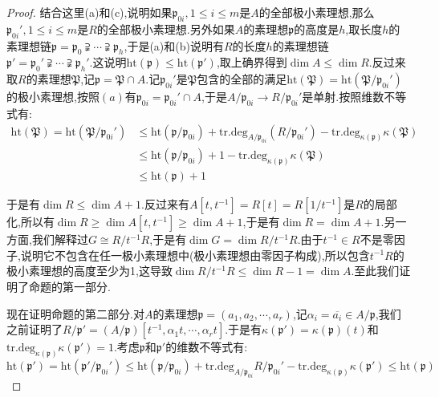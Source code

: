 \begin{enumerate}
\begin{proof}
        结合这里(a)和(c),说明如果$\mathfrak{p}_{0i},1\le i\le m$是$A$的全部极小素理想,那么$\mathfrak{p}_{0i}',1\le i\le m$是$R$的全部极小素理想.另外如果$A$的素理想$\mathfrak{p}$的高度是$h$,取长度$h$的素理想链$\mathfrak{p}=\mathfrak{p}_0\supsetneqq\cdots\supsetneqq\mathfrak{p}_h$,于是(a)和(b)说明有$R$的长度$h$的素理想链$\mathfrak{p}'=\mathfrak{p}_0'\supsetneqq\cdots\supsetneqq\mathfrak{p}_h'$.这说明$\mathrm{ht}(\mathfrak{p})\le\mathrm{ht}(\mathfrak{p}')$,取上确界得到$\dim A\le\dim R$.反过来取$R$的素理想$\mathfrak{P}$,记$\mathfrak{p}=\mathfrak{P}\cap A$.记$\mathfrak{p}_{0i}'$是$\mathfrak{P}$包含的全部的满足$\mathrm{ht}(\mathfrak{P})=\mathrm{ht}(\mathfrak{P}/\mathfrak{p}_{0i}')$的极小素理想,按照$(a)$有$\mathfrak{p}_{0i}=\mathfrak{p}_{0i}'\cap A$,于是$A/\mathfrak{p}_{0i}\to R/\mathfrak{p}_{0i}'$是单射.按照维数不等式有:
        \begin{align*}
        	\mathrm{ht}(\mathfrak{P})=\mathrm{ht}(\mathfrak{P}/\mathfrak{p}_{0i}')&\le\mathrm{ht}(\mathfrak{p}/\mathfrak{p}_{0i})+\mathrm{tr.deg}_{A/\mathfrak{p}_{0i}}(R/\mathfrak{p}_{0i}')-\mathrm{tr.deg}_{\kappa(\mathfrak{p})}\kappa(\mathfrak{P})\\&\le\mathrm{ht}(\mathfrak{p}/\mathfrak{p}_{0i})+1-\mathrm{tr.deg}_{\kappa(\mathfrak{p})}\kappa(\mathfrak{P})\\&\le\mathrm{ht}(\mathfrak{p})+1
        \end{align*}
    
        于是有$\dim R\le\dim A+1$.反过来有$A[t,t^{-1}]=R[t]=R[1/t^{-1}]$是$R$的局部化,所以有$\dim R\ge\dim A[t,t^{-1}]\ge\dim A+1$,于是有$\dim R=\dim A+1$.另一方面,我们解释过$G\cong R/t^{-1}R$,于是有$\dim G=\dim R/t^{-1}R$.由于$t^{-1}\in R$不是零因子,说明它不包含在任一极小素理想中(极小素理想由零因子构成),所以包含$t^{-1}R$的极小素理想的高度至少为1,这导致$\dim R/t^{-1}R\le\dim R-1=\dim A$.至此我们证明了命题的第一部分.
        
        \qquad
        
        现在证明命题的第二部分.对$A$的素理想$\mathfrak{p}=(a_1,a_2,\cdots,a_r)$,记$\alpha_i=\overline{a_i}\in A/\mathfrak{p}$,我们之前证明了$R/\mathfrak{p}'=(A/\mathfrak{p})[t^{-1},\alpha_1t,\cdots,\alpha_rt]$.于是有$\kappa(\mathfrak{p}')=\kappa(\mathfrak{p})(t)$和$\mathrm{tr.deg}_{\kappa(\mathfrak{p})}\kappa(\mathfrak{p}')=1$.考虑$\mathfrak{p}$和$\mathfrak{p}'$的维数不等式有:
        $$\mathrm{ht}(\mathfrak{p}')=\mathrm{ht}(\mathfrak{p}'/\mathfrak{p}_{0i}')\le\mathrm{ht}(\mathfrak{p}/\mathfrak{p}_{0i})+\mathrm{tr.deg}_{A/\mathfrak{p}_{0i}}R/\mathfrak{p}_{0i}'-\mathrm{tr.deg}_{\kappa(\mathfrak{p})}\kappa(\mathfrak{p}')\le\mathrm{ht}(\mathfrak{p})$$
        

\end{proof}
\end{enumerate}
